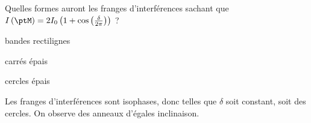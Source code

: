
\begin{enonce}
	 Quelles formes auront les franges d'interférences sachant que $I\left(\ptM\right)=2I_0 \left(1 + \cos \left( \frac{\delta}{2\pi} \right) \right)$ ?
	\begin{listeQCM3Colonnes}
	\item bandes rectilignes
	\item carrés épais
	\item cercles épais
	\end{listeQCM3Colonnes}
	\bigskip
\end{enonce}

\reponse{\reponseC{}}

\begin{corrige}
	Les franges d'interférences sont isophases, donc telles que $\delta$ soit constant, soit des cercles. On observe des anneaux d'égales inclinaison.
\end{corrige}


\finEntrainement



\clearpage











